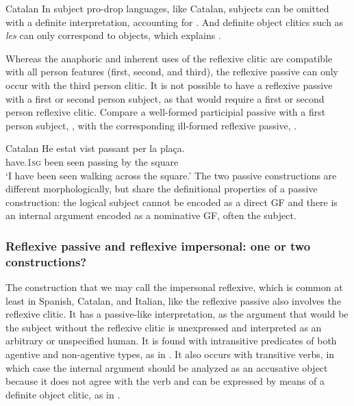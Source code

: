 \documentclass[output=paper,hidelinks]{langscibook}
\begin{document}
\ea\label{ex:Romance:44} Catalan
\z\z
In subject pro-drop languages, like Catalan, subjects can be omitted with a definite interpretation, accounting for . And definite object clitics such as \textit{les} can only correspond to objects, which explains .

Whereas the anaphoric and inherent uses of the reflexive clitic are compatible with all person features (first, second, and third), the reflexive passive can only occur with the third person clitic. It is not possible to have a reflexive passive with a first or second person subject, as that would require a first or second person reflexive clitic. Compare a well-formed participial passive with a first person subject, , with the corresponding ill-formed reflexive passive, .

\ea\label{ex:Romance:45} Catalan
\ea\label{ex:Romance:45a}
\gll He estat vist passant per la plaça.\\
have.\textsc{1sg} been seen passing by the square\\
\glt  `I have been seen walking across the square.'
  \z\z
The two passive constructions are different morphologically, but share the definitional properties of a passive construction: the logical subject cannot be encoded as a direct GF and there is an internal argument encoded as a nominative GF, often the subject.

\subsubsection{Reflexive passive and reflexive impersonal: one or two
  constructions?}
\label{sec:Romance:3.2.2}

The construction that we may call the impersonal reflexive, which is common at least in Spanish, Catalan, and Italian, like the reflexive passive also involves the reflexive clitic. It has a passive-like interpretation, as the argument that would be the subject without the reflexive clitic is unexpressed and interpreted as an arbitrary or unspecified human. It is found with intransitive predicates of both agentive and non-agentive types, as in . It also occurs with transitive verbs, in which case the internal argument should be analyzed as an accusative object because it does not agree with the verb and can be expressed by means of a definite object clitic, as in . 
\end{document}
